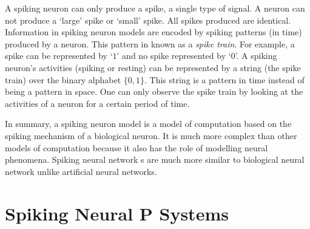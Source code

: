 \documentclass[12pt,A4]{article}
\begin{document}
A spiking neuron can only produce a spike, a single type of signal. A neuron can not produce a 
`large' spike or `small' spike. All spikes produced are identical. Information in spiking neuron
models are encoded by spiking patterns (in time) produced by a neuron. This pattern in known as
a \emph{spike train}. For example, a spike can be represented by `$1$' and no spike represented by
`$0$'. A spiking neuron's activities (spiking or resting) can be represented by a string (the spike
train) over the binary alphabet $\{0,1\}$. This string is a pattern in time instead of being a
pattern in space. One can only observe the spike train by looking at the activities of a neuron for
a certain period of time.

In summary, a spiking neuron model is  a model of computation based on the spiking mechanism of a
biological neuron. It is much more complex than other models of computation because it also has the
role of modelling neural phenomena. Spiking neural network s are much more similar to biological 
neural network unlike artificial neural networks.


\section*{Spiking Neural P Systems}


\section*{}




\end{document}
